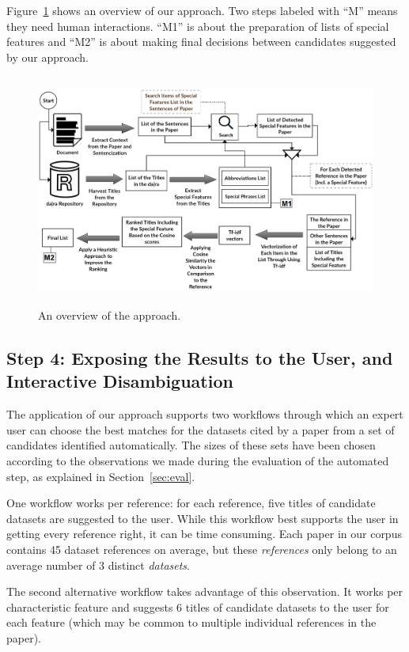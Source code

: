 \documentclass{IOS-Book-Article}
\begin{document}
Figure~\ref{fig:Overview_of_approach} shows an overview of our approach. Two steps labeled with \enquote{M} means they need human interactions. \enquote{M1} is about the preparation of lists of special features and \enquote{M2} is about making final decisions between candidates suggested by our approach.

\begin{figure}[h]
	\centering
	\includegraphics[height=3in]{Overwveiw_System.png}
	\caption{An overview of the approach.}
	\label{fig:Overview_of_approach}
\end{figure}

\subsection{Step 4: Exposing the Results to the User, and Interactive Disambiguation}
\label{sec:expos-results-reus}	
The application of our approach supports two workflows through which an expert user can choose the best matches for the datasets cited by a paper from a set of candidates identified automatically. The sizes of these sets have been chosen according to the observations we made during the evaluation of the automated step, as explained in Section~\ref{sec:eval}.

One workflow works per reference: for each reference, five titles of candidate datasets are suggested to the user. While this workflow best supports the user in getting every reference right, it can be time consuming. Each paper in our corpus contains 45 dataset references on average, but these \emph{references} only belong to an average number of 3 distinct \emph{datasets}.

The second alternative workflow takes advantage of this observation. It works per characteristic feature and suggests 6 titles of candidate datasets to the user for each feature (which may be common to multiple individual references in the paper). 
\end{document}
